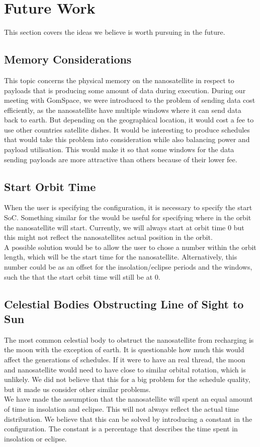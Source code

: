 \section{Future Work} \label{sec:future}
This section covers the ideas we believe is worth pursuing in the future.

\subsection{Memory Considerations}
This topic concerns the physical memory on the nanosatellite in respect to payloads that is producing some amount of data during execution. 
During our meeting with GomSpace, we were introduced to the problem of sending data cost efficiently, as the nanosatellite have multiple windows where it can send data back to earth. 
But depending on the geographical location, it would cost a fee to use other countries satellite dishes.
It would be interesting to produce schedules that would take this problem into consideration while also balancing power and payload utilisation.
This would make it so that some windows for the data sending payloads are more attractive than others because of their lower fee.

\subsection{Start Orbit Time}
When the user is specifying the configuration, it is necessary to specify the start SoC. Something similar for the would be useful for specifying where in the orbit the nanosatellite will start. Currently, we will always start at orbit time 0 but this might not reflect the nanosatellites actual position in the orbit.\\
A possible solution would be to allow the user to chose a number within the orbit length, which will be the start time for the nanosatellite. Alternatively, this number could be as an offset for the insolation/eclipse periods and the windows, such the that the start orbit time will still be at 0.

\subsection{Celestial Bodies Obstructing Line of Sight to Sun}
The most common celestial body to obstruct the nanosatellite from recharging is the moon with the exception of earth.
It is questionable how much this would affect the generations of schedules. If it were to have an real thread, the moon and nanosatellite would need to have close to similar orbital rotation, which is unlikely. We did not believe that this for a big problem for the schedule quality, but it made us consider other similar problems.\\
We have made the assumption that the nanosatellite will spent an equal amount of time in insolation and eclipse. This will not always reflect the actual time distribution. We believe that this can be solved by introducing a constant in the configuration. The constant is a percentage that describes the time spent in insolation or eclipse. 

